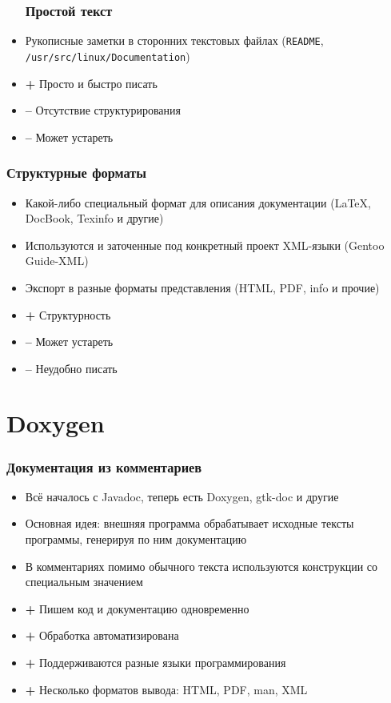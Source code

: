 \documentclass[onlymath]{beamer}
\newcommand\good{{\color{green!50!black} \textbf{+}}}
\newcommand\bad{{\color{red!50!black} \textbf{--}}}
\begin{document}
\begin{frame}
  \begin{itemize}
    \frametitle{Простой текст}
    
  \item Рукописные заметки в сторонних текстовых файлах
    (\texttt{README}, \texttt{/usr/src/linux/Documentation})
    
  \item \good{} Просто и быстро писать
  \item \bad{} Отсутствие структурирования
  \item \bad{} Может устареть    
  \end{itemize}
\end{frame}

\begin{frame}
  \frametitle{Структурные форматы}
  \begin{itemize}
  \item Какой-либо специальный формат для описания документации
    (LaTeX, DocBook, Texinfo и другие)
  \item Используются и заточенные под конкретный проект XML-языки
    (Gentoo Guide-XML)
  \item Экспорт в разные форматы представления (HTML, PDF, info и
    прочие)

  \item \good{} Структурность
  \item \bad{} Может устареть
  \item \bad{} Неудобно писать
  \end{itemize}
\end{frame}

\section{Doxygen}

\begin{frame}
  \frametitle{Документация из комментариев}
  \begin{itemize}
  \item Всё началось с Javadoc, теперь есть Doxygen, gtk-doc и другие
  \item Основная идея: внешняя программа обрабатывает исходные тексты
    программы, генерируя по ним документацию
  \item В комментариях помимо обычного текста используются конструкции
    со специальным значением
  \item \good{} Пишем код и документацию одновременно
  \item \good{} Обработка автоматизирована
  \item \good{} Поддерживаются разные языки программирования
  \item \good{} Несколько форматов вывода: HTML, PDF, man, XML
  \end{itemize}
\end{frame}
\end{document}
